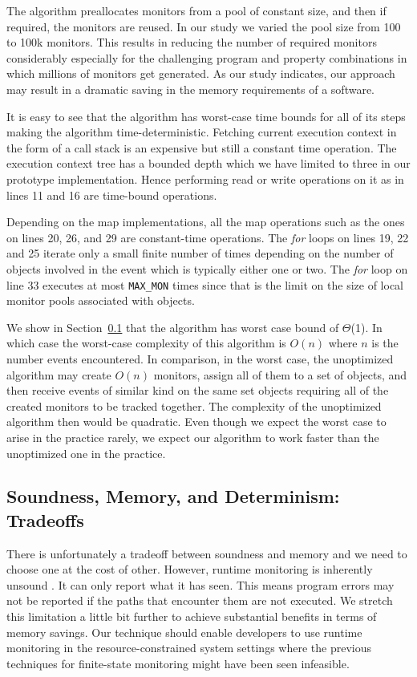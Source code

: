 The algorithm preallocates monitors from a pool of constant size, and then if 
required, the monitors are reused. In our study we varied the pool size from 100 
to 100k monitors. This results in reducing the number of required monitors 
considerably especially for the challenging program and property combinations in 
which millions of monitors get generated. As our study indicates, our approach 
may result in a dramatic saving in the memory requirements of a software.

It is easy to see that the algorithm has worst-case time bounds for all of its 
steps making the algorithm time-deterministic. Fetching current execution 
context in the form of a call stack is an expensive but still a constant time 
operation. The execution context tree has a bounded depth which we have limited 
to three in our prototype implementation. Hence performing read or write 
operations on it as in lines 11 and 16 are time-bound operations.

Depending on the map implementations, all the map operations such as the ones on 
lines 20, 26, and 29 are constant-time operations. The \textit{for} loops on 
lines 19, 22 and 25 iterate only a small finite number of times depending on the 
number of objects involved in the event which is typically either one or two. 
The \textit{for} loop on line 33 executes at most \texttt{MAX\_MON} times since 
that is the limit on the size of local monitor pools associated with objects.

We show in Section~\ref{subsec:tradeoff} that the algorithm has worst case bound of
$\Theta$(1). In which case the worst-case complexity of this algorithm is $O(n)$
where $n$ is the number events encountered. In comparison, in the worst case,
the unoptimized algorithm may create $O(n)$ monitors, assign all of them to a set of objects,
 and then receive events of similar kind on the same set objects
 requiring all of the created monitors to be tracked together.  The complexity of the
 unoptimized algorithm then would be quadratic. Even though we expect the worst case to arise 
 in the practice rarely, we expect our algorithm to work faster than the unoptimized one in the practice.
 

\subsection{Soundness, Memory, and Determinism: Tradeoffs}
\label{subsec:tradeoff}

There is unfortunately a tradeoff between soundness and memory and we need to 
choose one at the cost of other. However, runtime monitoring is inherently 
unsound \cite{}. It can only report what it has seen. This means program errors 
may not be reported if the paths that encounter them are not executed. We 
stretch this limitation a little bit further to achieve substantial benefits in 
terms of memory savings.
Our technique should enable developers to use runtime 
monitoring in the resource-constrained system settings where the previous 
techniques for finite-state monitoring might have been seen infeasible.

